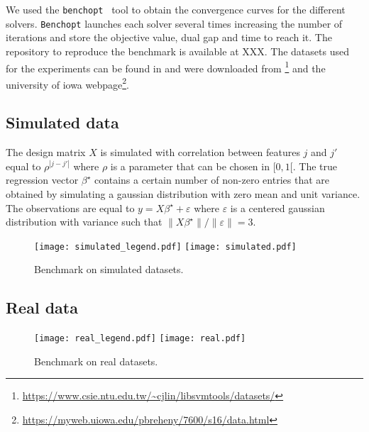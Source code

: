 We used the \texttt{benchopt}~\parencite{moreau2022benchopt} tool to obtain the convergence curves for the different solvers.
\texttt{Benchopt} launches each solver several times increasing the number of iterations and store the objective value, dual gap and time to reach it.
The repository to reproduce the benchmark is available at XXX.
The datasets used for the experiments can be found in  and were downloaded from \footnote{\url{https://www.csie.ntu.edu.tw/~cjlin/libsvmtools/datasets/}} and the university of iowa webpage\footnote{\url{https://myweb.uiowa.edu/pbreheny/7600/s16/data.html}}.


\subsection{Simulated data}

The design matrix $X$ is simulated with correlation between features $j$ and $j'$ equal to $\rho^{|j-j'|}$ where $\rho$ is a parameter that can be chosen in $[0, 1[$.
The true regression vector $\beta^\star$ contains a certain number of non-zero entries that are obtained by simulating a gaussian distribution with zero mean and unit variance.
The observations are equal to $y=X\beta^\star + \varepsilon$ where $\varepsilon$ is a centered gaussian distribution with variance such that $\lVert X\beta^\star\rVert / \lVert \varepsilon \rVert = 3$.
\begin{figure*}[htb]
  \centering
  \texttt{[image: simulated\_legend.pdf]}
  \texttt{[image: simulated.pdf]}
  \caption{Benchmark on simulated datasets.}
  \label{fig:simaulted}
\end{figure*}

\subsection{Real data}
\begin{figure*}[htb]
  \centering
  \texttt{[image: real\_legend.pdf]}
  \texttt{[image: real.pdf]}
  \caption{Benchmark on real datasets.}
  \label{fig:real}
\end{figure*}
